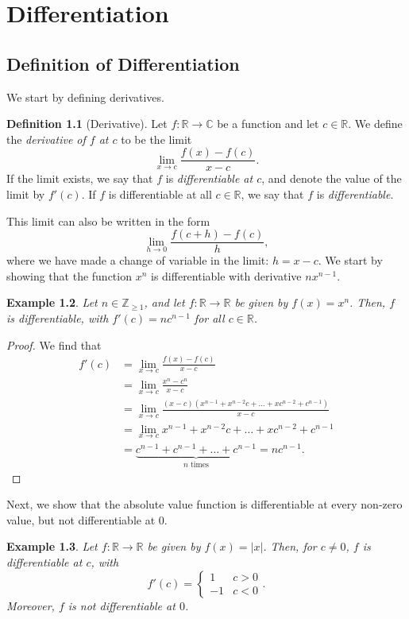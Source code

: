\documentclass[a4paper, openany]{memoir}
\theoremstyle{definition}
\newtheorem{definition}{Definition}[section]
\theoremstyle{plain}
\newtheorem{example}[definition]{Example}
\begin{document}
\chapter{Differentiation}

\section{Definition of Differentiation}
We start by defining derivatives.
\begin{definition}[Derivative]
Let $f: \mathbb{R} \to \mathbb{C}$ be a function and let $c \in \mathbb{R}$. We define the \emph{derivative of $f$ at $c$} to be the limit
\[\lim_{x \to c} \frac{f(x) - f(c)}{x - c}.\]
If the limit exists, we say that $f$ is \emph{differentiable at $c$}, and denote the value of the limit by $f'(c)$. If $f$ is differentiable at all $c \in \mathbb{R}$, we say that $f$ is \emph{differentiable}.
\end{definition}
\noindent This limit can also be written in the form
\[\lim_{h \to 0} \frac{f(c + h) - f(c)}{h},\]
where we have made a change of variable in the limit: $h = x - c$. We start by showing that the function $x^n$ is differentiable with derivative $nx^{n-1}$.
\begin{example}
Let $n \in \mathbb{Z}_{\geqslant 1}$, and let $f: \mathbb{R} \to \mathbb{R}$ be given by $f(x) = x^n$. Then, $f$ is differentiable, with $f'(c) = nc^{n-1}$ for all $c \in \mathbb{R}$.
\end{example}
\begin{proof}
We find that
\begin{align*}
    f'(c) &= \lim_{x \to c} \frac{f(x) - f(c)}{x - c} \\
    &= \lim_{x \to c} \frac{x^n - c^n}{x - c} \\
    &= \lim_{x \to c} \frac{(x - c)(x^{n-1} + x^{n-2}c + \dots + x c^{n-2} + c^{n-1})}{x - c} \\
    &= \lim_{x \to c} x^{n-1} + x^{n-2}c + \dots + xc^{n-2} + c^{n-1} \\
    &= \underbrace{c^{n-1} + c^{n-1} + \dots + c^{n-1}}_{n \text{ times}} = nc^{n-1}.
\end{align*}
\end{proof}
\noindent Next, we show that the absolute value function is differentiable at every non-zero value, but not differentiable at 0.
\begin{example}
Let $f: \mathbb{R} \to \mathbb{R}$ be given by $f(x) = |x|$. Then, for $c \neq 0$, $f$ is differentiable at $c$, with
\[f'(c) = \begin{cases}
1 & c > 0 \\
-1 & c < 0
\end{cases}.\]
Moreover, $f$ is not differentiable at $0$.
\end{example}
\end{document}
